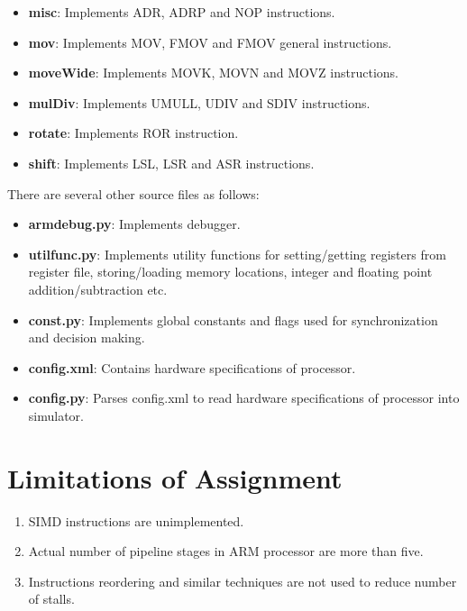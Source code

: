 \documentclass[12pt]{report}
\begin{document}
\begin{itemize}
\begin{itemize}
\item{\textbf{misc}: Implements ADR, ADRP and NOP instructions.}
\item{\textbf{mov}: Implements MOV, FMOV and FMOV general instructions.}
\item{\textbf{moveWide}: Implements MOVK, MOVN and MOVZ instructions.}
\item{\textbf{mulDiv}: Implements UMULL, UDIV and SDIV instructions.}
\item{\textbf{rotate}: Implements ROR instruction.}
\item{\textbf{shift}: Implements LSL, LSR and ASR instructions.}
\end{itemize}
\end{itemize}

There are several other source files as follows:
\begin{itemize}
\item{\textbf{armdebug.py}: Implements debugger.}
\item{\textbf{utilfunc.py}: Implements utility functions for setting/getting registers from register file, storing/loading memory locations, integer and floating point addition/subtraction etc.}
\item{\textbf{const.py}: Implements global constants and flags used for synchronization and decision making.}
\item{\textbf{config.xml}: Contains hardware specifications of processor.}
\item{\textbf{config.py}: Parses config.xml to read hardware specifications of processor into simulator. }
\end{itemize}

\section*{Limitations of Assignment}
\begin{enumerate}
\item{SIMD instructions are unimplemented.}
\item{Actual number of pipeline stages in ARM processor are more than five.}
\item{Instructions reordering and similar techniques are not used to reduce number of stalls.}
\end{enumerate}

\clearpage
\end{document}
